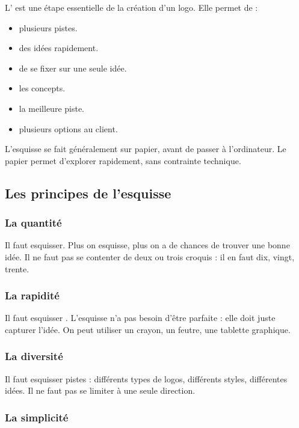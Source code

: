 L' est une étape essentielle de la création d'un logo. Elle permet de :

\begin{itemize}
    \item {} plusieurs pistes.
    \item {} des idées rapidement.
    \item {} de se fixer sur une seule idée.
    \item {} les concepts.
    \item {} la meilleure piste.
    \item {} plusieurs options au client.
\end{itemize}

L'esquisse se fait généralement sur papier, avant de passer à l'ordinateur. Le papier permet d'explorer rapidement, sans contrainte technique.

\subsection{Les principes de l'esquisse}

\subsubsection{La quantité}

Il faut  esquisser. Plus on esquisse, plus on a de chances de trouver une bonne idée. Il ne faut pas se contenter de deux ou trois croquis : il en faut dix, vingt, trente.

\subsubsection{La rapidité}

Il faut esquisser . L'esquisse n'a pas besoin d'être parfaite : elle doit juste capturer l'idée. On peut utiliser un crayon, un feutre, une tablette graphique.

\subsubsection{La diversité}

Il faut esquisser  pistes : différents types de logos, différents styles, différentes idées. Il ne faut pas se limiter à une seule direction.

\subsubsection{La simplicité}

